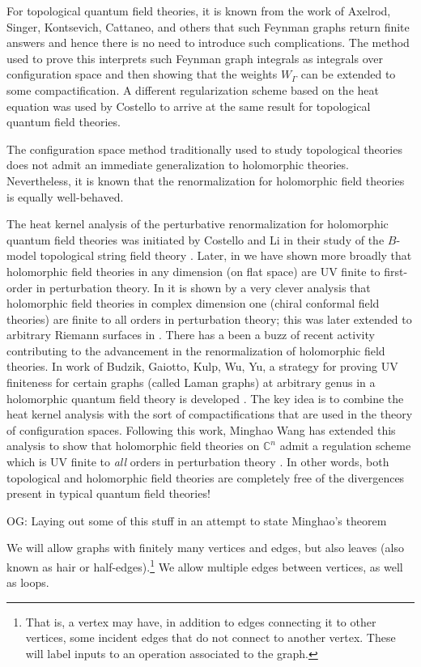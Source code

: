\documentclass[11pt]{amsart}
\def\C{{\mathbb{C}}}
\def\owen#1{{\textcolor{violet!50!black}{OG: {#1}}}}
\begin{document}
For topological quantum field theories, it is known from the work of Axelrod, Singer, Kontsevich, Cattaneo, and others \cite{???} that such Feynman graphs return finite answers and hence there is no need to introduce such complications.
The method used to prove this interprets such Feynman graph integrals as integrals over configuration space and then showing that the weights $W_\Gamma$ can be extended to some compactification.
A different regularization scheme based on the heat equation was used by Costello \cite{CosRenormPaper} to arrive at the same result for topological quantum field theories.

The configuration space method traditionally used to study topological theories does not admit an immediate generalization to holomorphic theories.
Nevertheless, it is known that the renormalization for holomorphic field theories is equally well-behaved.

The heat kernel analysis of the perturbative renormalization for holomorphic quantum field theories was initiated by Costello and Li in their study of the $B$-model topological string field theory \cite{??}.
Later, in \cite{Whol} we have shown more broadly that holomorphic field theories in any dimension (on flat space) are UV finite to first-order in perturbation theory.
In \cite{LiVertex} it is shown by a very clever analysis that holomorphic field theories in complex dimension one (chiral conformal field theories) are finite to all orders in perturbation theory; this was later extended to arbitrary Riemann surfaces in \cite{Jie and Si}.
There has a been a buzz of recent activity contributing to the advancement in the renormalization of holomorphic field theories.
In work of Budzik, Gaiotto, Kulp, Wu, Yu, a strategy for proving UV finiteness for certain graphs (called Laman graphs) at arbitrary genus in a holomorphic quantum field theory is developed \cite{BGKWY}.
The key idea is to combine the heat kernel analysis with the sort of compactifications that are used in the theory of configuration spaces.
Following this work, Minghao Wang has extended this analysis to show that holomorphic field theories on $\C^n$ admit a regulation scheme which is UV finite to \textit{all} orders in perturbation theory \cite{Wang}.
In other words, both topological and holomorphic field theories are completely free of the divergences present in typical quantum field theories!

\owen{Laying out some of this stuff in an attempt to state Minghao's theorem}

We will allow graphs with finitely many vertices and edges, 
but also leaves (also known as hair or half-edges).\footnote{That is, a vertex may have, in addition to edges connecting it to other vertices, some incident edges that do not connect to another vertex. 
These will label inputs to an operation associated to the graph.}
We allow multiple edges between vertices, as well as loops.
\end{document}
